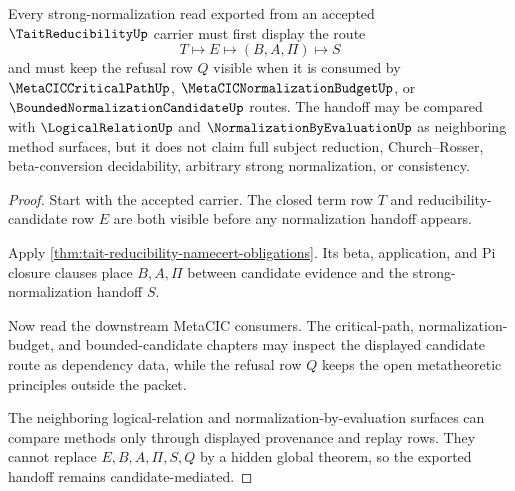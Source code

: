 \begin{theorem}
\label{thm:tait-reducibility-candidate-sn-handoff}
Every strong-normalization read exported from an accepted $\TaitReducibilityUp$ carrier must first display the route
$$
T \longmapsto E \longmapsto (B,A,\Pi) \longmapsto S
$$
and must keep the refusal row $Q$ visible when it is consumed by $\MetaCICCriticalPathUp$, $\MetaCICNormalizationBudgetUp$, or $\BoundedNormalizationCandidateUp$ routes. The handoff may be compared with $\LogicalRelationUp$ and $\NormalizationByEvaluationUp$ as neighboring method surfaces, but it does not claim full subject reduction, Church--Rosser, beta-conversion decidability, arbitrary strong normalization, or consistency.
\end{theorem}
\begin{proof}
Start with the accepted carrier. The closed term row $T$ and reducibility-candidate row $E$ are both visible before any normalization handoff appears.

Apply \autoref{thm:tait-reducibility-namecert-obligations}. Its beta, application, and Pi closure clauses place $B,A,\Pi$ between candidate evidence and the strong-normalization handoff $S$.

Now read the downstream MetaCIC consumers. The critical-path, normalization-budget, and bounded-candidate chapters may inspect the displayed candidate route as dependency data, while the refusal row $Q$ keeps the open metatheoretic principles outside the packet.

The neighboring logical-relation and normalization-by-evaluation surfaces can compare methods only through displayed provenance and replay rows. They cannot replace $E,B,A,\Pi,S,Q$ by a hidden global theorem, so the exported handoff remains candidate-mediated.
\end{proof}


\begin{closurestatus}{\TaitReducibilityUp}
  \theoryclosure{\seedClosure}
  \formalstatus{\unformalizedV}
\end{closurestatus}
